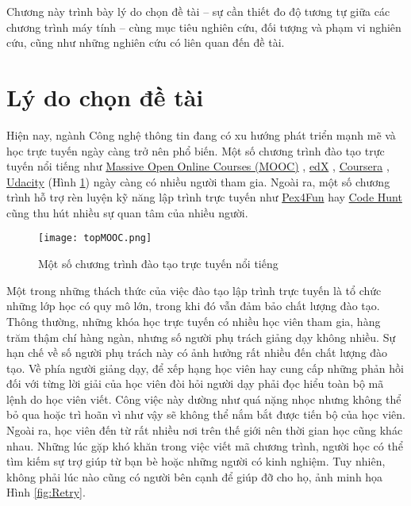 Chương này trình bày lý do chọn đề tài -- sự cần thiết đo độ tương tự
giữa các chương trình máy tính -- cùng mục tiêu nghiên cứu, đối tượng và phạm
vi nghiên cứu, cũng như những nghiên cứu có liên quan đến đề tài.

\section{Lý do chọn đề tài}

Hiện nay, ngành Công nghệ thông tin đang có xu hướng phát triển mạnh
mẽ và học trực tuyến ngày càng trở nên phổ biến. Một số chương trình
đào tạo trực tuyến nổi tiếng như
\href{https://www.coursera.org/course/saas}{Massive Open Online
  Courses (MOOC)} \cite{mooc}, \href{https://www.edx.org/}{edX}
\cite{edx}, \href{https://www.coursera.org/}{Coursera}
\cite{coursera}, \href{http://www.udacity.com/}{Udacity}
\cite{Udacity} (Hình \ref{fig:progarming-online}) ngày càng có nhiều người tham gia. Ngoài ra, một số
chương trình hỗ trợ rèn luyện kỹ năng lập trình trực tuyến như
\href{https://www.pexforfun.com/}{Pex4Fun} \cite{Pex4Fun} hay
\href{https://www.microsoft.com/en-us/research/project/code-hunt/}{Code
  Hunt} \cite{CodeHunt} cũng thu hút nhiều sự quan tâm của nhiều
người. 

\begin{figure}[h]
	\centering
	\texttt{[image: topMOOC.png]}
	\caption{Một số chương trình đào tạo trực tuyến nổi tiếng}
	\label{fig:progarming-online}		
\end{figure}

Một trong những thách thức của việc đào tạo lập trình trực tuyến là
tổ chức những lớp học có quy mô lớn, trong khi đó vẫn
đảm bảo chất lượng đào tạo. Thông thường, những khóa học trực tuyến
có nhiều học viên tham gia, hàng trăm thậm chí hàng ngàn, 
nhưng số người phụ trách giảng dạy không nhiều. Sự hạn chế về
số người phụ trách này có ảnh hưởng rất nhiều đến chất lượng đào
tạo. Về phía người giảng dạy, để xếp hạng học viên hay cung cấp những
phản hồi đối với từng lời giải của học viên đòi hỏi người dạy phải đọc hiểu
toàn bộ mã lệnh do học viên viết. Công việc này dường như quá nặng
nhọc nhưng không thể bỏ qua hoặc trì hoãn vì như vậy sẽ không thể nắm bắt
được tiến bộ của học viên. Ngoài ra, học viên đến từ rất
nhiều nơi trên thế giới nên thời gian học cũng khác nhau. Những lúc 
gặp khó khăn trong việc viết mã chương trình, người học có thể tìm kiếm sự
trợ giúp từ bạn bè hoặc những người có kinh nghiệm. Tuy
nhiên, không phải lúc nào cũng có người bên cạnh để giúp
đỡ cho họ, ảnh minh họa Hình \ref{fig:Retry}. 

